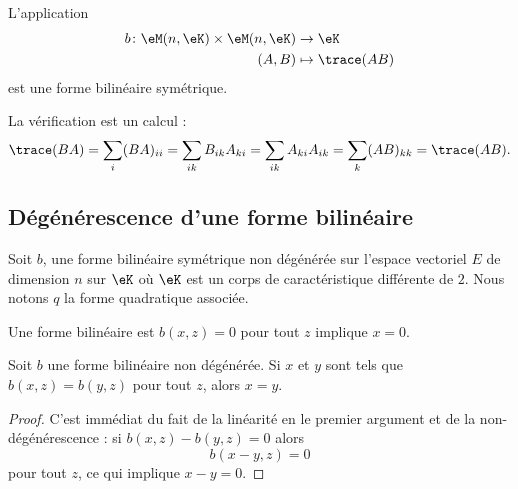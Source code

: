 \begin{example}
    L'application
    \begin{equation}
        \begin{aligned}
            b\colon \eM(n,\eK)\times \eM(n,\eK)&\to \eK \\
            (A,B)&\mapsto \trace(AB) 
        \end{aligned}
    \end{equation}
    est une forme bilinéaire symétrique.

    La vérification est un calcul :
    \begin{equation}
        \trace(BA)=\sum_{i}(BA)_{ii}=\sum_{ik}B_{ik}A_{ki}=\sum_{ik}A_{ki}A_{ik}=\sum_k(AB)_{kk}=\trace(AB).
    \end{equation}
\end{example}

\subsection{Dégénérescence d'une forme bilinéaire}

Soit \( b\), une forme bilinéaire symétrique non dégénérée  sur l'espace vectoriel \( E\) de dimension \( n\) sur \( \eK\) où \( \eK\) est un corps de caractéristique différente de \( 2\). Nous notons \( q\) la forme quadratique associée.

\begin{definition}      \label{DEFooNUBFooLfCqaK}
    Une forme bilinéaire est  \( b(x,z)=0\) pour tout \( z\) implique \( x=0\).
\end{definition}

\begin{lemma}   \label{LemyKJpVP}
    Soit \( b\) une forme bilinéaire non dégénérée. Si \( x\) et \( y\) sont tels que \( b(x,z)=b(y,z)\) pour tout \( z\), alors \( x=y\).
\end{lemma}

\begin{proof}
    C'est immédiat du fait de la linéarité en le premier argument et de la non-dégénérescence : si \( b(x,z)-b(y,z)=0\) alors
    \begin{equation}
        b(x-y,z)=0
    \end{equation}
    pour tout \( z\), ce qui implique \( x-y=0\).
\end{proof}

